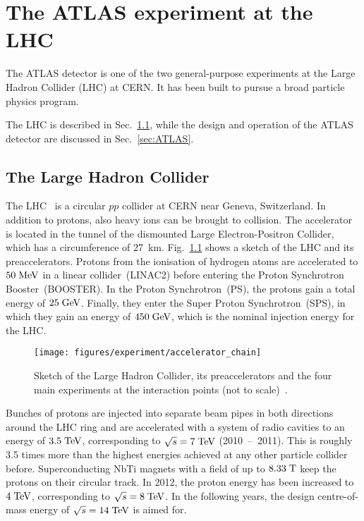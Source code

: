 \chapter{The ATLAS experiment at the LHC}
\label{sec:experiment}

The ATLAS detector is one of the two general-purpose experiments 
at the Large Hadron Collider (LHC) at CERN.
It has been built to pursue a broad particle physics program. 

The LHC is described in Sec.~\ref{sec:LHC}, while the design and operation of the 
ATLAS detector are discussed in Sec.~\ref{sec:ATLAS}.

\section{The Large Hadron Collider}
\label{sec:LHC}

The LHC~\cite{LHCreport12, *LHCreport3} is a circular $pp$ collider at CERN near Geneva, Switzerland.
In addition to protons, also heavy ions can be brought to collision.
The accelerator is located in the tunnel of the dismounted Large Electron-Positron Collider, which has a circumference of 27~km.
Fig.~\ref{fig:lhc} shows a sketch of the LHC and its preaccelerators.
Protons from the ionisation of hydrogen atoms are accelerated to \mbox{$50 \; \mathrm{MeV}$} in a linear collider~(LINAC2) before entering the Proton Synchrotron
Booster~(BOOSTER).
In the Proton Synchrotron~(PS), the protons gain a total energy of \mbox{$25 \; \mathrm{GeV}$}.
Finally, they enter the Super Proton Synchrotron~(SPS), in which they gain an energy of \mbox{$450 \; \mathrm{GeV}$}, which is the nominal injection energy for the LHC.

\begin{figure}[h]
\begin{center}
\texttt{[image: figures/experiment/accelerator\_chain]}
\caption[Sketch of the Large Hadron Collider]{
  Sketch of the Large Hadron Collider, its preaccelerators and the four main experiments at the interaction points (not to scale)~\cite{anna}.}
\label{fig:lhc}
\end{center}
\end{figure}

Bunches of protons are injected into separate beam pipes in both directions around the LHC ring and are accelerated
with a system of radio cavities to an energy of \mbox{$3.5 \; \mathrm{TeV}$}, corresponding to \mbox{$\sqrt{s} = 7 \; \mathrm{TeV}$} (2010~--~2011).
This is roughly 3.5 times more than the highest energies achieved at any other particle collider before.
Superconducting NbTi magnets with a field of up to \mbox{$8.33 \; \mathrm{T}$} keep the protons on their circular track.
In 2012, the proton energy has been increased to \mbox{$4 \; \mathrm{TeV}$}, corresponding to \mbox{$\sqrt{s} = 8 \; \mathrm{TeV}$}.
In the following years, the design centre-of-mass energy of \mbox{$\sqrt{s} = 14 \; \mathrm{TeV}$} is aimed for.

